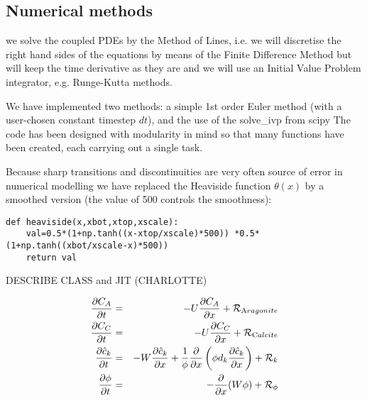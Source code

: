 \documentclass[a4paper]{article}
\newcommand{\nn}{\nonumber}
\newcommand{\python}{\color{darkgray} \sffamily }
\begin{document}
\subsection*{Numerical methods}

we solve the coupled PDEs by the Method of Lines, i.e.
we will discretise the right hand sides of the equations by means of the Finite 
Difference Method but will keep the time derivative as they are and we will 
use an Initial Value Problem integrator, e.g. Runge-Kutta methods.

We have implemented two methods: a simple 1st order Euler method (with a 
user-chosen constant timestep $dt$), and 
the use of the {\python solve\_ivp} from {\python scipy} %
The code has been designed with modularity in mind so that many functions 
have been created, each carrying out a single task.

Because sharp transitions and discontinuities are very often source of error
in numerical modelling we have replaced the Heaviside function $\theta(x)$
by a smoothed version (the value of 500 controls the smoothness):

\begin{lstlisting}
def heaviside(x,xbot,xtop,xscale):
    val=0.5*(1+np.tanh((x-xtop/xscale)*500)) *0.5*(1+np.tanh((xbot/xscale-x)*500))
    return val 
\end{lstlisting}

DESCRIBE CLASS and JIT (CHARLOTTE)

\begin{eqnarray}
\frac{\partial C_A}{\partial t} &=& -U \frac{\partial C_A}{\partial x}  + {\cal R}_{\text Aragonite}
\nn\\
\frac{\partial C_C}{\partial t} &=& -U \frac{\partial C_C}{\partial x}  + {\cal R}_{\text Calcite} 
\nn\\
\frac{\partial \hat{c}_k}{\partial t} &=& -W \frac{\partial \hat{c}_k}{\partial x}
+\frac{1}{\phi} \frac{\partial}{\partial x} \left( \phi d_k \frac{\partial \hat{c}_k}{\partial x} \right)
+{\cal R}_{k}
\nn\\ 
\frac{\partial \phi}{\partial t} &=& -\frac{\partial}{\partial x} (W \phi) +{\cal R}_\phi
\end{eqnarray}
\end{document}
